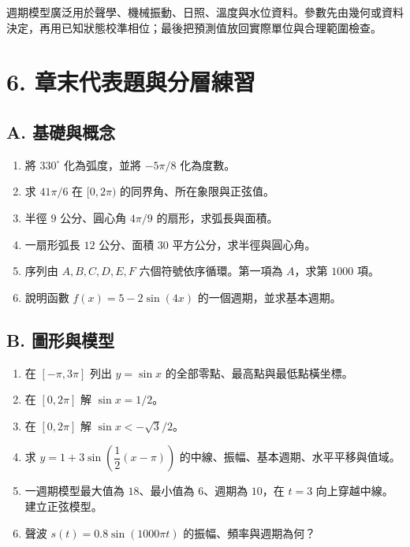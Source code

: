 \documentclass[11pt,a4paper]{article}
\providecommand{\tightlist}{%
  \setlength{\itemsep}{0pt}\setlength{\parskip}{0pt}}
\begin{document}
週期模型廣泛用於聲學、機械振動、日照、溫度與水位資料。參數先由幾何或資料決定，再用已知狀態校準相位；最後把預測值放回實際單位與合理範圍檢查。

\section{6. 章末代表題與分層練習}\label{ux7ae0ux672bux4ee3ux8868ux984cux8207ux5206ux5c64ux7df4ux7fd2}

\subsection{A. 基礎與概念}\label{a.-ux57faux790eux8207ux6982ux5ff5}

\begin{enumerate}
\def\labelenumi{\arabic{enumi}.}
\tightlist
\item
  將 \(330^\circ\) 化為弧度，並將 \(-5\pi/8\) 化為度數。
\item
  求 \(41\pi/6\) 在 \([0,2\pi)\) 的同界角、所在象限與正弦值。
\item
  半徑 \(9\) 公分、圓心角 \(4\pi/9\) 的扇形，求弧長與面積。
\item
  一扇形弧長 \(12\) 公分、面積 \(30\) 平方公分，求半徑與圓心角。
\item
  序列由 \(A,B,C,D,E,F\) 六個符號依序循環。第一項為 \(A\)，求第 \(1000\) 項。
\item
  說明函數 \(f(x)=5-2\sin(4x)\) 的一個週期，並求基本週期。
\end{enumerate}

\subsection{B. 圖形與模型}\label{b.-ux5716ux5f62ux8207ux6a21ux578b}

\begin{enumerate}
\def\labelenumi{\arabic{enumi}.}
\setcounter{enumi}{6}
\tightlist
\item
  在 \([-\pi,3\pi]\) 列出 \(y=\sin x\) 的全部零點、最高點與最低點橫坐標。
\item
  在 \([0,2\pi]\) 解 \(\sin x=1/2\)。
\item
  在 \([0,2\pi]\) 解 \(\sin x<-\sqrt3/2\)。
\item
  求 \(y=1+3\sin\left(\dfrac12(x-\pi)\right)\) 的中線、振幅、基本週期、水平平移與值域。
\item
  一週期模型最大值為 \(18\)、最小值為 \(6\)、週期為 \(10\)，在 \(t=3\) 向上穿越中線。建立正弦模型。
\item
  聲波 \(s(t)=0.8\sin(1000\pi t)\) 的振幅、頻率與週期為何？
\end{enumerate}
\end{document}
